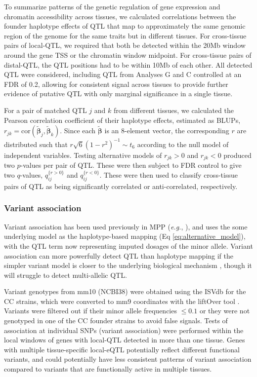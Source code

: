 \documentclass[10pt,letterpaper]{article}
\newcommand{\eg}{\emph{e.g.}\xspace}
\newcommand{\bbeta}{\boldsymbol{\beta}}
\newcommand{\blup}{\widetilde{\bbeta}}
\begin{document}
To summarize patterns of the genetic regulation of gene expression and chromatin accessibility across tissues, we calculated correlations between the founder haplotype effects of QTL that map to approximately the same genomic region of the genome for the same traits but in different tissues. For cross-tissue pairs of local-QTL, we required that both be detected within the 20Mb window around the gene TSS or the chromatin window midpoint. For cross-tissue pairs of distal-QTL, the QTL positions had to be within 10Mb of each other. All detected QTL were considered, including QTL from Analyses G and C controlled at an FDR of 0.2, allowing for consistent signal across tissues to provide further evidence of putative QTL with only marginal significance in a single tissue.

For a pair of matched QTL $j$ and $k$ from different tissues, we calculated the Pearson correlation coefficient of their haplotype effects, estimated as BLUPs, $r_{jk} = \text{cor}(\blup_j, \blup_k)$. Since each $\blup$ is an 8-element vector, the corresponding $r$ are distributed such that $r\sqrt{6}(1 - r^{2})^{-1} \sim t_{6}$ according to the null model of independent variables. Testing alternative models of $r_{jk} > 0$ and $r_{jk} < 0$ produced two $p$-values per pair of QTL. These were then subject to FDR control \cite{Benjamini1995} to give two $q$-values, $q_{ij}^{\{r > 0\}}$ and $q_{ij}^{\{r < 0\}}$. These were then used to classify cross-tissue pairs of QTL as being significantly correlated or anti-correlated, respectively. 

\subsubsection*{Variant association}

Variant association has been used previously in MPP (\eg, \cite{Baud2014, Keele2018}), and uses the some underlying model as the haplotype-based mapping (Eq \ref{eq:alternative_model}), with the QTL term now representing imputed dosages of the minor allele. Variant association can more powerfully detect QTL than haplotype mapping if the simpler variant model is closer to the underlying biological mechanism \cite{Yalcin2005}, though it will struggle to detect multi-allelic QTL.

Variant genotypes from mm10 (NCBI38) were obtained using the ISVdb \cite{Oreper2017} for the CC strains, which were converted to mm9 coordinates with the liftOver tool \cite{Lawrence2009}. Variants were filtered out if their minor allele frequencies $\le 0.1$ or they were not genotyped in one of the CC founder strains to avoid false signals.
Tests of association at individual SNPs (variant association) were performed within the local windows of genes with local-QTL detected in more than one tissue. 
Genes with multiple tissue-specific local-eQTL potentially reflect different functional variants, and could potentially have less consistent patterns of variant association compared to variants that are functionally active in multiple tissues.
\end{document}
